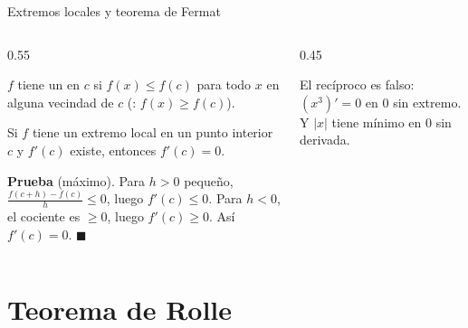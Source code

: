 \documentclass[10pt,aspectratio=169]{beamer}
\begin{document}
\begin{frame}{Extremos locales y teorema de Fermat}
  \begin{columns}
    \begin{column}{0.55\textwidth}
      \begin{definicion}
        $f$ tiene un  en $c$ si $f(x)\le f(c)$ para todo $x$ en alguna vecindad de $c$
        (: $f(x)\ge f(c)$).
      \end{definicion}
      \begin{teorema}[Fermat]
        Si $f$ tiene un extremo local en un punto interior $c$ y $f'(c)$ existe, entonces $f'(c)=0$.
      \end{teorema}
      \textbf{Prueba} (máximo). Para $h>0$ pequeño, $\frac{f(c+h)-f(c)}{h}\le0$, luego $f'(c)\le0$. Para $h<0$, el cociente es $\ge0$, luego $f'(c)\ge0$.
      Así $f'(c)=0$. $\blacksquare$
    \end{column}
    \begin{column}{0.45\textwidth}
      \centering
      \begin{observacion}
        El recíproco es falso: $(x^3)'=0$ en $0$ sin extremo. Y $|x|$ tiene mínimo en $0$ sin derivada.
      \end{observacion}
    \end{column}
  \end{columns}
\end{frame}

\section{Teorema de Rolle}
\end{document}
